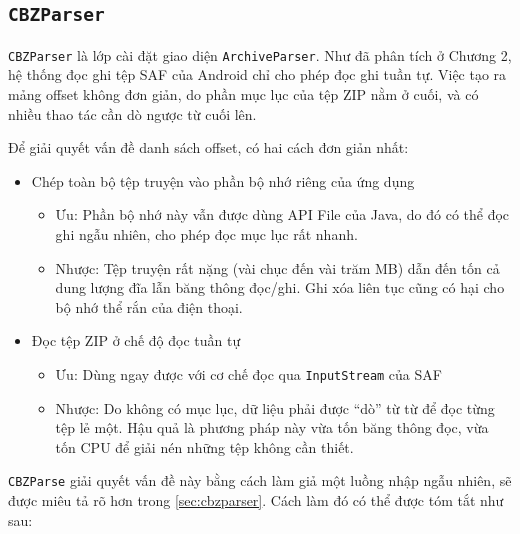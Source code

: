 \documentclass[../../../../thesis]{subfiles}
\begin{document}

\subsection{\texttt{CBZParser}}

\texttt{CBZParser} là lớp cài đặt giao diện \texttt{ArchiveParser}. Như đã phân
tích ở Chương 2, hệ thống đọc ghi tệp SAF của Android chỉ cho phép đọc ghi tuần
tự. Việc tạo ra mảng offset không đơn giản, do phần mục lục của tệp ZIP nằm ở
cuối, và có nhiều thao tác cần dò ngược từ cuối lên.

Để giải quyết vấn đề danh sách offset, có hai cách đơn giản nhất:

\begin{itemize}
    \item
        Chép toàn bộ tệp truyện vào phần bộ nhớ riêng của ứng dụng

        \begin{itemize}
            \item
                Ưu: Phần bộ nhớ này vẫn được dùng API File của Java, do đó có
                thể đọc ghi ngẫu nhiên, cho phép đọc mục lục rất nhanh.
            \item
                Nhược: Tệp truyện rất nặng (vài chục đến vài trăm MB) dẫn đến
                tốn cả dung lượng đĩa lẫn băng thông đọc/ghi. Ghi xóa liên tục
                cũng có hại cho bộ nhớ thể rắn của điện thoại.
        \end{itemize}
    \item
        Đọc tệp ZIP ở chế độ đọc tuần tự

        \begin{itemize}
            \item
                Ưu: Dùng ngay được với cơ chế đọc qua \texttt{InputStream} của
                SAF
            \item
                Nhược: Do không có mục lục, dữ liệu phải được ``dò'' từ từ để
                đọc từng tệp lẻ một. Hậu quả là phương pháp này vừa tốn băng
                thông đọc, vừa tốn CPU để giải nén những tệp không cần thiết.
        \end{itemize}
\end{itemize}

\texttt{CBZParse} giải quyết vấn đề này bằng cách làm giả một luồng nhập ngẫu
nhiên, sẽ được miêu tả rõ hơn trong \autoref{sec:cbzparser}. Cách làm đó có thể
được tóm tắt như sau:
\end{document}
